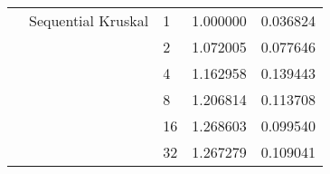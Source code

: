 \begin{tabular}{lllrr}
                       & Sequential Kruskal & 1  &  1.000000 &  0.036824 \\
                       &                    & 2  &  1.072005 &  0.077646 \\
                       &                    & 4  &  1.162958 &  0.139443 \\
                       &                    & 8  &  1.206814 &  0.113708 \\
                       &                    & 16 &  1.268603 &  0.099540 \\
                       &                    & 32 &  1.267279 &  0.109041 \\
\bottomrule
\end{tabular}
